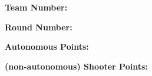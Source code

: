 \documentclass{article}
\begin{document}
{\noindent\begin{minipage}{.15\linewidth}
	\begin{center}
		\textbf{Team Number: \linebreak} \\[1em]
	\end{center}
\end{minipage}
\begin{minipage}{.17\linewidth} %
	\begin{center}
		\textbf{Round Number: \linebreak} \\[1em]
	\end{center}
\end{minipage}
\begin{minipage}{.2\linewidth}
	\begin{center}
		\textbf{Autonomous Points: \linebreak} \\[1em]
	\end{center}
\end{minipage}
\begin{minipage}{.2\linewidth} %
	\begin{center}
		\textbf{(non-autonomous) \linebreak Shooter Points:} \\[1em]
	\end{center}
\end{minipage}
\\[2em]

}
\end{document}
